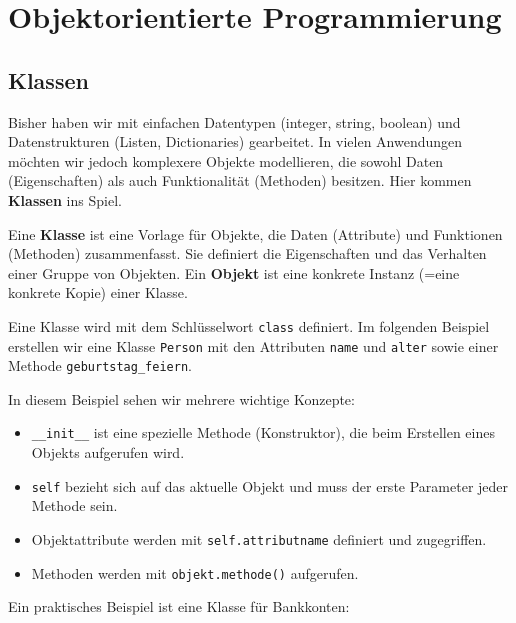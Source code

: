 \chapter{Objektorientierte Programmierung}
\section{Klassen}
Bisher haben wir mit einfachen Datentypen (integer, string, boolean) und Datenstrukturen (Listen, Dictionaries) gearbeitet. In vielen Anwendungen möchten wir jedoch komplexere Objekte modellieren, die sowohl Daten (Eigenschaften) als auch Funktionalität (Methoden) besitzen. Hier kommen \textbf{Klassen} ins Spiel.

\begin{mydefinition}
Eine \textbf{Klasse} ist eine Vorlage für Objekte, die Daten (Attribute) und Funktionen (Methoden) zusammenfasst. Sie definiert die Eigenschaften und das Verhalten einer Gruppe von Objekten. Ein \textbf{Objekt} ist eine konkrete Instanz (=eine konkrete Kopie) einer Klasse.
\end{mydefinition}

\begin{myexample}
Eine Klasse wird mit dem Schlüsselwort \lstinline|class| definiert. Im folgenden Beispiel erstellen wir eine Klasse \lstinline|Person| mit den Attributen \lstinline|name| und \lstinline|alter| sowie einer Methode \lstinline|geburtstag_feiern|.


\end{myexample}

In diesem Beispiel sehen wir mehrere wichtige Konzepte:

\begin{itemize}
    \item \lstinline|__init__| ist eine spezielle Methode (Konstruktor), die beim Erstellen eines Objekts aufgerufen wird.
    \item \lstinline|self| bezieht sich auf das aktuelle Objekt und muss der erste Parameter jeder Methode sein.
    \item Objektattribute werden mit \lstinline|self.attributname| definiert und zugegriffen.
    \item Methoden werden mit \lstinline|objekt.methode()| aufgerufen.
\end{itemize}

\begin{myexample}
Ein praktisches Beispiel ist eine Klasse für Bankkonten:


\end{myexample}

